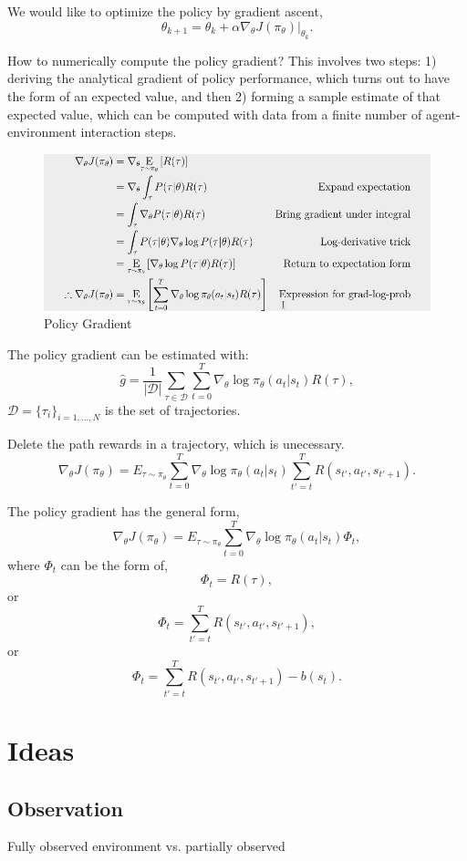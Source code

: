\documentclass{article}
\begin{document}
    We would like to optimize the policy by gradient ascent, 
    $$
    \theta_{k+1} = \theta_k + \alpha \nabla_{\theta} J(\pi_{\theta})|_{\theta_k}.
    $$

    How to numerically compute the policy gradient? This involves two steps: 1) deriving the analytical gradient of policy performance, which turns out to have the form of an expected value, and then 2) forming a sample estimate of that expected value, which can be computed with data from a finite number of agent-environment interaction steps.
    \begin{figure}[H]
      \includegraphics[width=\linewidth]{derivative.png}
      \caption{Policy Gradient}
      \label{fig:policygradient}
    \end{figure}

    The policy gradient can be estimated with: 
    $$
    \hat{g} = \frac{1}{|\mathcal{D}|} \sum_{\tau \in \mathcal{D}} \sum_{t=0}^{T} \nabla_{\theta} \log \pi_{\theta}(a_t |s_t) R(\tau),
    $$
    $\mathcal{D} = \{\tau_i\}_{i=1,...,N}$ is the set of trajectories.

    Delete the path rewards in a trajectory, which is unecessary.
    $$
    \nabla_{\theta} J(\pi_{\theta}) = E_{\tau \sim \pi_{\theta}}{\sum_{t=0}^{T} \nabla_{\theta} \log \pi_{\theta}(a_t |s_t) \sum_{t'=t}^T R(s_{t'}, a_{t'}, s_{t'+1})}.
    $$

    The policy gradient has the general form, 
    $$
    \nabla_{\theta} J(\pi_{\theta}) = E_{\tau \sim \pi_{\theta}}{\sum_{t=0}^{T} \nabla_{\theta} \log \pi_{\theta}(a_t |s_t) \Phi_t},
    $$
    where $\Phi_t$ can be the form of, 
    $$
    \Phi_t = R(\tau),
    $$
    or 
    $$
    \Phi_t = \sum_{t'=t}^T R(s_{t'}, a_{t'}, s_{t'+1}),
    $$
    or 
    $$
    \Phi_t = \sum_{t'=t}^T R(s_{t'}, a_{t'}, s_{t'+1}) - b(s_t).
    $$
  \section{Ideas}
    \subsection{Observation}
      Fully observed environment vs. partially observed\
\end{document}
